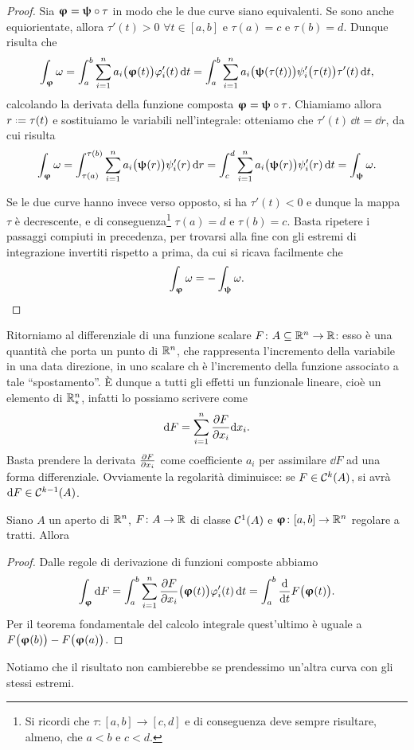 \begin{proof}
	Sia $\bm{\upvarphi}=\bm{\uppsi}\circ\tau$ in modo che le due curve siano equivalenti.
	Se sono anche equiorientate, allora $\tau'(t)>0$ $\forall t\in[a,b]$ e $\tau(a)=c$ e $\tau(b)=d$.
	Dunque risulta che
	\begin{equation}
		\int_{\bm{\upvarphi}}\omega=\int_a^b\sum_{i=1}^na_i\big(\bm{\upvarphi}(t)\big)\varphi_i'(t)\,\textup{d} t
		=\int_a^b\sum_{i=1}^na_i\big(\bm{\uppsi}(\tau(t))\big)\psi_i'\big(\tau(t)\big)\tau'(t)\,\textup{d} t,
	\end{equation}
	calcolando la derivata della funzione composta $\bm{\upvarphi}=\bm{\uppsi}\circ\tau$.
	Chiamiamo allora $r\defeq\tau(t)$ e sostituiamo le variabili nell'integrale: otteniamo che $\tau'(t)\,\dd t=\dd r$, da cui risulta
	\begin{equation}
		\int_{\bm{\upvarphi}}\omega=\int_{\tau(a)}^{\tau(b)}\sum_{i=1}^na_i\big(\bm{\uppsi}(r)\big)\psi_i'(r)\,\textup{d} r
		=\int_c^d\sum_{i=1}^na_i\big(\bm{\uppsi}(r)\big)\psi_i'(r)\,\textup{d} t=\int_{\bm{\uppsi}}\omega.
	\end{equation}
	
	Se le due curve hanno invece verso opposto, si ha $\tau'(t)<0$ e dunque la mappa $\tau$ è decrescente, e di conseguenza\footnote{Si ricordi che $\tau\colon[a,b]\to[c,d]$ e di conseguenza deve sempre risultare, almeno, che $a<b$ e $c<d$.} $\tau(a)=d$ e $\tau(b)=c$. Basta ripetere i passaggi compiuti in precedenza, per trovarsi alla fine con gli estremi di integrazione invertiti rispetto a prima, da cui si ricava facilmente che
	\begin{equation*}
		\int_{\bm{\upvarphi}}\omega=-\int_{\bm{\uppsi}}\omega.\qedhere
	\end{equation*}
\end{proof}
Ritorniamo al differenziale di una funzione scalare $F\colon A\subseteq\mathbb{R}^n\to\mathbb{R}$: esso è una quantità che porta un punto di $\mathbb{R}^n$, che rappresenta l'incremento della variabile in una data direzione, in uno scalare ch è l'incremento della funzione associato a tale ``spostamento''.
È dunque a tutti gli effetti un funzionale lineare, cioè un elemento di $\mathbb{R}^n_*$, infatti lo possiamo scrivere come
\begin{equation*}
	\textup{d} F=\sum_{i=1}^n\frac{\partial {F}}{\partial {x_i}}\textup{d} x_i.
\end{equation*}
Basta prendere la derivata $\frac{\partial {F}}{\partial {x_i}}$ come coefficiente $a_i$ per assimilare $\dd F$ ad una forma differenziale.
Ovviamente la regolarità diminuisce: se $F\in\mathcal{C}^{{k}}(A)$, si avrà $\textup{d} F\in\mathcal{C}^{{k-1}}(A)$.
\begin{teorema}
	 Siano $A$ un aperto di $\mathbb{R}^n$, $F\colon A\to\mathbb{R}$ di classe $\mathcal{C}^{{1}}(A)$ e $\bm{\upvarphi}\colon[a,b]\to\mathbb{R}^n$ regolare a tratti. Allora
\end{teorema}
\begin{proof}
	Dalle regole di derivazione di funzioni composte abbiamo
	\begin{equation}
		\int_{\bm{\upvarphi}}\textup{d} F=\int_a^b\sum_{i=1}^n\frac{\partial {F}}{\partial {x_i}}\big(\bm{\upvarphi}(t)\big)\varphi_i'(t)\,\textup{d} t=\int_a^b\frac{\textup{d} {}}{\textup{d} {t}}F\big(\bm{\upvarphi}(t)\big).
	\end{equation}
	Per il teorema fondamentale del calcolo integrale quest'ultimo è uguale a $F\big(\bm{\upvarphi}(b)\big)-F\big(\bm{\upvarphi}(a)\big)$.
\end{proof}
Notiamo che il risultato non cambierebbe se prendessimo un'altra curva con gli stessi estremi.

